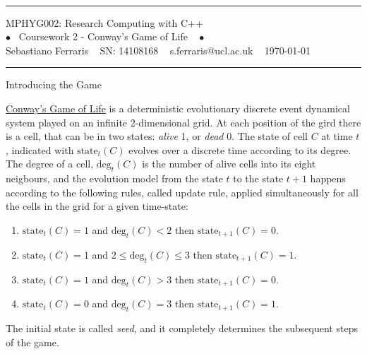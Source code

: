 \documentclass[11pt, twoside]{article}
\newcommand{\cambiaFont}[2]{{\fontencoding{T1}\fontfamily{#1}%
		\selectfont#2}}
\begin{document}
\setcounter{page}{1}
\pagestyle{fancy} 



~\vspace{-2cm} 
\begin{center}  	
	
	\hrule
	
	\vspace{0.5cm} 
	\color{Black} MPHYG002: Research Computing with C++ \color{Black}
	\vspace{0.5cm} \\
	\cambiaFont{ppl}{ \color{MidnightBlue} $\bullet$ \color{MidnightBlue} ~{\Large Coursework 2 - Conway's Game of Life } ~ \color{MidnightBlue}$\bullet$\color{black}} 
	\vspace{0.3cm} \\
	Sebastiano Ferraris  ~ SN: 14108168 ~  s.ferraris@ucl.ac.uk ~ \today 
	\vspace{0.5cm} 
	\hrule
	
\end{center}

\vspace{0.1in}







\begin{center}
	\color{MidnightBlue} {\Large Introducing the Game }\color{Black} 
\end{center}

\noindent
\href{https://en.wikipedia.org/wiki/Conway%27s_Game_of_Life}{Conway's Game of Life} is a deterministic evolutionary discrete event dynamical system played on an infinite 2-dimensional grid.
At each position of the gird there is a cell, that can be in two states: \emph{alive} 1, or \emph{dead} 0.
The state of cell $C$ at time $t$, indicated with $\text{state}_t(C)$ evolves over a discrete time according to its degree. The degree of a cell, $\text{deg}_t(C)$ is the number of alive cells into its eight neigbours, and the evolution model from the state $t$ to the state $t+1$ happens according to the following rules, called update rule, applied simultaneously for all the cells in the grid for a given time-state:
\begin{enumerate}
	\item $\text{state}_t(C) = 1$ and $\text{deg}_t(C)<2$ then $\text{state}_{t+1}(C) = 0$.
	\item $\text{state}_t(C) = 1$ and $2 \leq\text{deg}_t(C) \leq 3$ then $\text{state}_{t+1}(C) = 1$.
	\item $\text{state}_t(C) = 1$ and $\text{deg}_t(C)>3$ then $\text{state}_{t+1}(C) = 0$.
	\item $\text{state}_t(C) = 0$ and $\text{deg}_t(C)=3$ then $\text{state}_{t+1}(C) = 1$.
\end{enumerate}
The initial state is called \emph{seed}, and it completely determines the subsequent steps of the game.
\end{document}
